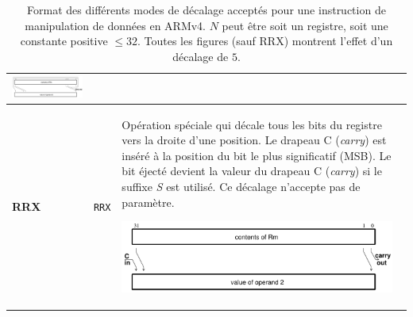 \documentclass{tufte-handout}
\begin{document}
\begin{table}
\begin{tabular}{l|l|p{13.5cm}}
\includegraphics[width=9cm]{pics/ror.png} \\  \hline
  
 \textbf{RRX} & \texttt{RRX} & Opération spéciale qui décale tous les bits du registre vers la droite d'une position. Le drapeau C (\textit{carry}) est inséré à la position du bit le plus significatif (MSB). Le bit éjecté devient la valeur du drapeau C (\textit{carry}) si le suffixe \textit{S} est utilisé. Ce décalage n'accepte pas de paramètre. 
 
\includegraphics[width=9cm]{pics/rrx.png} \\
\end{tabular}
\label{t:decalage}
\caption{Format des différents modes de décalage acceptés pour une instruction de manipulation de données en ARMv4. $N$ peut être soit un registre, soit une constante positive $\leq 32$. Toutes les figures (sauf RRX) montrent l'effet d'un décalage de $5$.}
\end{table}
\end{document}

